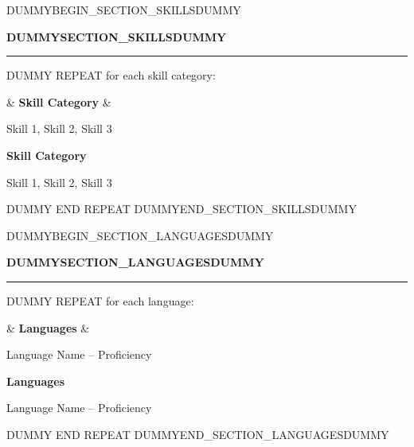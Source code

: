 \documentclass[a4paper,10pt]{article}
\newlength{\cvleftcolumnwidth}
\newlength{\cvrightcolumnwidth}
\newlength{\cvcolumngapwidth}
\newlength{\cvaftersectionskipamount}
\newlength{\cvafteritemskipamount}
\newlength{\cvbetweensectionandheadingextraskipamount}
\newlength{\cvparskip}
\newcommand{\cvsectionstyle}[1]{\large\textbf{\textcolor{accentcolor}{#1}}}
\newcommand{\cvheadingstyle}[1]{\textbf{\textcolor{accentcolor}{#1}}}
\newcommand{\cvsection}[1]{
    \noindent\begin{minipage}[t]{\cvleftcolumnwidth}
        \raggedright\cvsectionstyle{#1}
    \end{minipage}%
    \hspace{\cvcolumngapwidth}%
    \begin{minipage}[t]{\cvrightcolumnwidth}
        \vspace{1.5mm} %
        \textcolor{cvrulecolor}{\rule{\cvrightcolumnwidth}{0.5mm}}
    \end{minipage}

    \vspace{\cvaftersectionskipamount}
}
\newcommand{\cvitem}[2]{
    \noindent
    \ifx&#1&%
        \begin{minipage}[t]{\textwidth}
            \setlength{\parskip}{\cvparskip} #2
        \end{minipage}\par
    \else
        \begin{minipage}[t]{\cvleftcolumnwidth}
            \raggedright #1
        \end{minipage}%
        \hspace{\cvcolumngapwidth}%
        \begin{minipage}[t]{\cvrightcolumnwidth}
            \setlength{\parskip}{\cvparskip} #2
        \end{minipage}\par
    \fi

    \vspace{\cvafteritemskipamount}
}
\begin{document}
DUMMYBEGIN_SECTION_SKILLSDUMMY
\cvsection{DUMMYSECTION_SKILLSDUMMY}

\vspace{\cvbetweensectionandheadingextraskipamount}

DUMMY REPEAT for each skill category:
\cvitem{
    \cvheadingstyle{Skill Category}
}{
    Skill 1, Skill 2, Skill 3
}
DUMMY END REPEAT
DUMMYEND_SECTION_SKILLSDUMMY


DUMMYBEGIN_SECTION_LANGUAGESDUMMY
\cvsection{DUMMYSECTION_LANGUAGESDUMMY}

\vspace{\cvbetweensectionandheadingextraskipamount}

DUMMY REPEAT for each language:
\cvitem{
    \cvheadingstyle{Languages}
}{
    Language Name -- Proficiency
}
DUMMY END REPEAT
DUMMYEND_SECTION_LANGUAGESDUMMY
\end{document}
